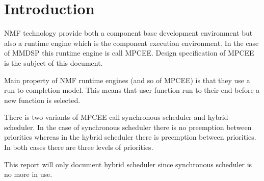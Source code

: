 \chapter{Introduction}
NMF technology provide both a component base development environment but also a
runtime engine which is the component execution environment. In the case of
MMDSP this runtime engine is call MPCEE. Design specification of MPCEE is the
subject of this document.

Main property of NMF runtime engines (and so of MPCEE) is that they use a run to
completion model. This means that user function run to their end before a new
function is selected. 

There is two variants of MPCEE call synchronous scheduler and hybrid scheduler.
In the case of synchronous scheduler there is no preemption between priorities
whereas in the hybrid scheduler there is preemption between priorities. In both
cases there are three levels of priorities.

This report will only document hybrid scheduler since synchronous scheduler is
no more in use.
